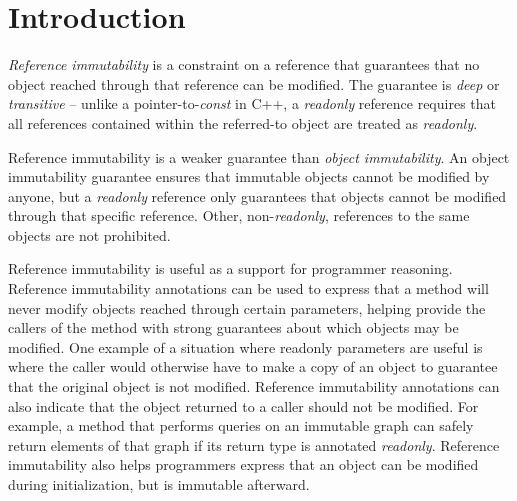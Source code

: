\documentclass[letterpaper,11pt]{article}
\theoremstyle{definition}
\theoremstyle{remark}
\begin{document}






\section{Introduction}
\label{introduction}

\emph{Reference immutability} is a constraint on a reference that guarantees that
no object reached through that reference can be modified.
The guarantee is \emph{deep} or \emph{transitive} --
unlike a pointer-to-\emph{const} in C++, a \emph{readonly} reference
requires that all references contained within the referred-to object
are treated as \emph{readonly}.

Reference immutability is a weaker guarantee than \emph{object immutability}.
An object immutability guarantee ensures that immutable objects cannot be modified
by anyone, but a \emph{readonly} reference only guarantees that objects cannot be modified
through that specific reference.
Other, non-\emph{readonly}, references to the same objects are not prohibited.

Reference immutability is useful as a support for programmer reasoning.
Reference immutability annotations can be used to express that
a method will never modify objects reached through certain parameters,
helping provide the callers of the method with strong guarantees about which
objects may be modified.
One example of a situation where readonly parameters are useful is where
the caller would otherwise have to make a copy of an object
to guarantee that the original object is not modified.
Reference immutability annotations can also indicate that the object returned
to a caller should not be modified.
For example, a method that performs queries on an immutable graph can safely
return elements of that graph if its return type is annotated \emph{readonly}.
Reference immutability also helps programmers express that an object
can be modified during initialization, but is immutable afterward.
\end{document}
